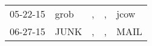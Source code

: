 \begin{supertabular}{lllll}
 05-22-15 &  grob &  , &  , &  jcow \\
 06-27-15 &  JUNK &  , &  , &  MAIL \\
\end{supertabular}
